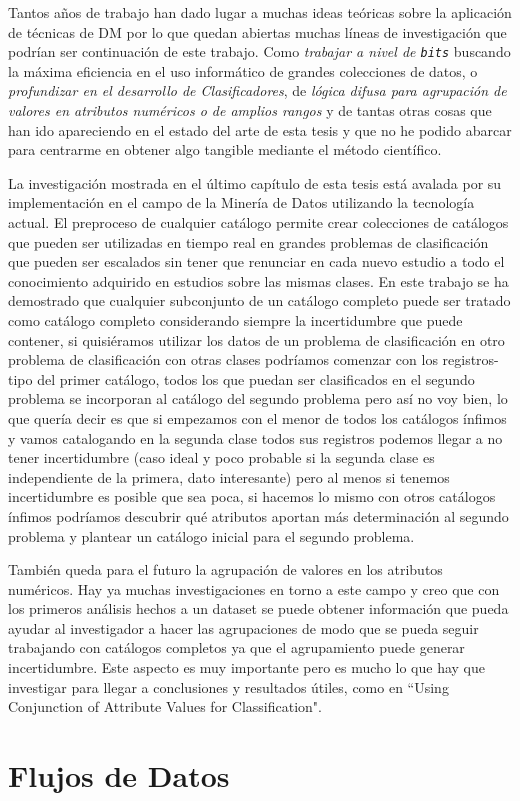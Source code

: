 
Tantos años de trabajo han dado lugar a muchas ideas teóricas sobre la aplicación de técnicas de DM por lo que quedan abiertas muchas líneas de investigación que podrían ser continuación de este trabajo. Como \emph{trabajar a nivel de \texttt{bits}} buscando la máxima eficiencia en el uso informático de grandes colecciones de datos, o \emph{profundizar en el desarrollo de Clasificadores}, de \emph{lógica difusa para agrupación de valores en atributos numéricos o de amplios rangos} y de tantas otras cosas que han ido apareciendo en el estado del arte de esta tesis y que no he podido abarcar para centrarme en obtener algo tangible mediante el método científico.

La investigación mostrada en el último capítulo de esta tesis está avalada por su implementación en el campo de la Minería de Datos utilizando la tecnología actual.
El preproceso de cualquier catálogo permite crear colecciones de catálogos que pueden ser utilizadas en tiempo real en grandes problemas de clasificación que pueden ser escalados sin tener que renunciar en cada nuevo estudio a todo el conocimiento adquirido en estudios sobre las mismas clases. En este trabajo se ha demostrado que cualquier subconjunto de un catálogo completo puede ser tratado como catálogo completo considerando siempre la incertidumbre que puede contener, si quisiéramos utilizar los datos de un problema de clasificación en otro problema de clasificación con otras clases podríamos comenzar con los registros-tipo del primer catálogo, todos los que puedan ser clasificados en el segundo problema se incorporan al catálogo del segundo problema pero así no  voy bien, lo que quería decir es que si empezamos con el menor de todos los catálogos ínfimos y vamos catalogando en la segunda clase todos sus registros podemos llegar a no tener incertidumbre (caso ideal y poco probable si la segunda clase es independiente de la primera, dato interesante) pero al menos si tenemos incertidumbre es posible que sea poca, si hacemos lo mismo con otros catálogos ínfimos podríamos descubrir qué atributos aportan más determinación al segundo problema y plantear un catálogo inicial para el segundo problema.

También queda para el futuro la agrupación de valores en los atributos numéricos. Hay ya muchas investigaciones en torno a este campo y creo que con los primeros análisis hechos a un dataset se puede obtener información que pueda ayudar al investigador a hacer las agrupaciones de modo que se pueda seguir trabajando con catálogos completos ya que el agrupamiento puede generar incertidumbre. Este aspecto es muy importante pero es mucho lo que hay que investigar para llegar a conclusiones y resultados útiles, como en ``Using Conjunction of Attribute Values for Classification".






\section{Flujos de Datos}
\label{sec:clasificacion:flujos-de-datos}

